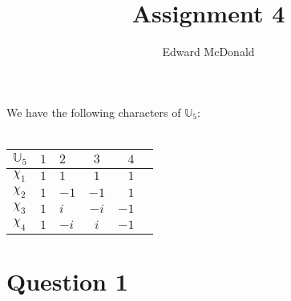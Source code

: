 \documentclass{unswmaths}
\begin{document}
\subject{Number Theory}
\author{Edward McDonald}
\title{Assignment 4}


\setlength\parindent{0pt}

\newcommand{\Unit}{\mathbb{U}}
\newcommand{\modulo}[1]{\;\operatorname{mod}\;#1}

\unswtitle{}

    
    \begin{definition}
        We have the following characters of $\Unit_5$:
        \\
        \\        
        \begin{tabular}{| l | cl  cr | r |}
        \hline
        $\Unit_5$ & $1$ & $2$ & $3$ & $4$\\
        \hline
        $\chi_1$  & $1$ & $1$ & $1$ & $1$\\
        $\chi_2$  & $1$ & $-1$ & $-1$ & $1$\\
        $\chi_3$  & $1$ & $i$ & $-i$ & $-1$\\
        $\chi_4$  & $1$ & $-i$ & $i$ & $-1$\\
        \hline
        \end{tabular}
    \end{definition}
    

\section*{Question 1}
\end{document}
